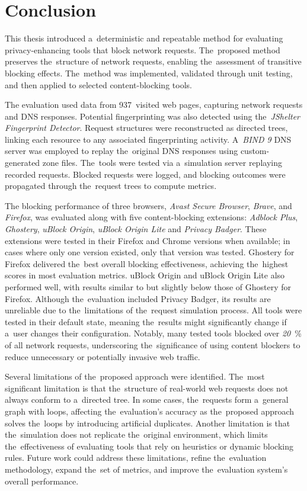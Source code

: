 \chapter{Conclusion}
\label{zaver}
This thesis introduced a~deterministic and repeatable method for evaluating privacy-{\linebreak}enhancing tools that block network requests. The~proposed method preserves the~structure of network requests, enabling the~assessment of transitive blocking effects. The~method was implemented, validated through unit testing, and then applied to selected content-blocking tools.

The evaluation used data from 937~visited web pages, capturing network requests and DNS responses. Potential fingerprinting was also detected using the~\textit{JShelter Fingerprint Detector}. Request structures were reconstructed as directed trees, linking each resource to any associated fingerprinting activity. A~\textit{BIND 9} DNS server was employed to replay the~original DNS responses using custom-generated zone files. The~tools were tested via a~simulation server replaying recorded requests. Blocked requests were logged, and blocking outcomes were propagated through the~request trees to compute metrics.

The blocking performance of three browsers, \emph{Avast Secure Browser}, \emph{Brave}, and \emph{Firefox}, was evaluated along with five content-blocking extensions: \emph{Adblock Plus}, \emph{Ghostery}, \emph{uBlock Origin}, \emph{uBlock Origin Lite} and \emph{Privacy Badger}. These extensions were tested in their Firefox and Chrome versions when available; in cases where only one version existed, only that version was tested. Ghostery for Firefox delivered the~best overall blocking effectiveness, achieving the~highest scores in most evaluation metrics. uBlock Origin and uBlock Origin Lite also performed well, with results similar to but slightly below those of Ghostery for Firefox. Although the~evaluation included Privacy Badger, its results are unreliable due to the~limitations of the~request simulation process. All tools were tested in their default state, meaning the~results might significantly change if a~user changes their configuration. Notably, many tested tools blocked over \emph{20}~\% of all network requests, underscoring the~significance of using content blockers to reduce unnecessary or potentially invasive web traffic.

Several limitations of the~proposed approach were identified. The~most significant limitation is that the~structure of real-world web requests does not always conform to a~directed tree. In some cases, the~requests form a~general graph with loops, affecting the~evaluation's accuracy as the~proposed approach solves the~loops by introducing artificial duplicates. Another limitation is that the~simulation does not replicate the~original environment, which limits the~effectiveness of evaluating tools that rely on heuristics or dynamic blocking rules. Future work could address these limitations, refine the~evaluation me\-tho\-do\-lo\-gy, expand the~set of metrics, and improve the~evaluation system's overall performance.
